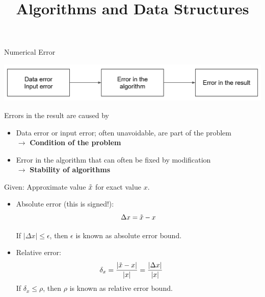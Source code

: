 \documentclass[11pt,compress,t,notes=noshow, xcolor=table]{beamer}
\title{Algorithms and Data Structures}
\begin{document}




\begin{vbframe}{Numerical Error}

\begin{center}
\includegraphics{figure_man/error_sources.PNG}
\end{center}

Errors in the result are caused by
\begin{itemize}
\item Data error or input error; often unavoidable, are part of the problem \\ $\to$ \textbf{Condition of the problem}
\item Error in the algorithm that can often be fixed by modification \\ $\to$ \textbf{Stability of algorithms}
\end{itemize}


\framebreak

Given: Approximate value $\tilde x$ for exact value $x$.

\begin{itemize}
\item Absolute error (this is signed!):
$$
  \Delta x = \tilde x - x
$$

If $|\Delta x| \le \epsilon$, then $\epsilon$ is known as absolute error bound.

\item Relative error:
$$
  \delta_x = \frac{|\tilde x - x|}{|x|} = \frac{|\Delta x|}{|x|}\qquad
$$
If $\delta_x \le \rho$, then $\rho$ is known as relative error bound.
\end{itemize}


\end{vbframe}
\end{document}
